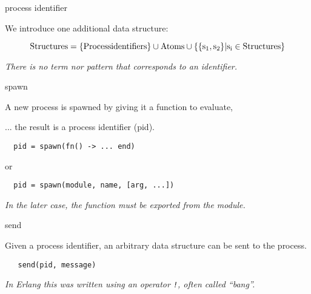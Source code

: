 \begin{frame}{process identifier}

We introduce one additional data structure:
\pause\vspace{10pt}

$${\rm Structures} = \{\rm Process identifiers\} \cup {\rm Atoms} \cup \{\{s_1, s_2\} | s_i \in {\rm Structures}\}$$

\pause\vspace{20pt} 
{\em There is no term nor pattern that corresponds to an identifier.}
\end{frame}

\begin{frame}[fragile]{spawn}

  A new process is spawned by giving it a function to evaluate, \pause
  
  \vspace{10pt}\hspace{40pt}... the result is a process identifier (pid).

\pause\vspace{20pt}
\begin{verbatim}
  pid = spawn(fn() -> ... end)
\end{verbatim}
\pause\vspace{10pt}
or
\pause\vspace{10pt}
\begin{verbatim}
  pid = spawn(module, name, [arg, ...])
\end{verbatim}
\pause\vspace{10pt}
{\em In the later case, the function must be exported from the module.}

\end{frame}

\begin{frame}[fragile]{send}

Given a process identifier, an arbitrary data structure can be sent to the process.

\pause\vspace{10pt}

\begin{verbatim}
   send(pid, message)
\end{verbatim}

\pause\vspace{20pt}
{\em In Erlang this was written using an operator {\tt !},  often called ``bang''.}

\end{frame}

